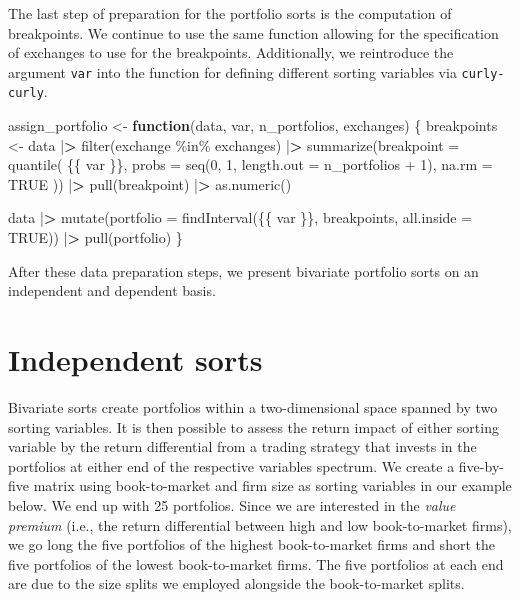 \documentclass[
]{book}
\newenvironment{Shaded}{\begin{snugshade}}{\end{snugshade}}
\newcommand{\AttributeTok}[1]{\textcolor[rgb]{0.61,0.61,0.61}{#1}}
\newcommand{\ConstantTok}[1]{\textcolor[rgb]{0,0,0}{#1}}
\newcommand{\ControlFlowTok}[1]{\textcolor[rgb]{0.27,0.27,0.27}{\textbf{#1}}}
\newcommand{\DecValTok}[1]{\textcolor[rgb]{0.06,0.06,0.06}{#1}}
\newcommand{\ErrorTok}[1]{\textcolor[rgb]{0.14,0.14,0.14}{\textbf{#1}}}
\newcommand{\FunctionTok}[1]{\textcolor[rgb]{0,0,0}{#1}}
\newcommand{\NormalTok}[1]{#1}
\newcommand{\OtherTok}[1]{\textcolor[rgb]{0.37,0.37,0.37}{#1}}
\newcommand{\SpecialCharTok}[1]{\textcolor[rgb]{0,0,0}{#1}}
\begin{document}
The last step of preparation for the portfolio sorts is the computation of breakpoints. We continue to use the same function allowing for the specification of exchanges to use for the breakpoints. Additionally, we reintroduce the argument \texttt{var} into the function for defining different sorting variables via \texttt{curly-curly}.

\begin{Shaded}
\begin{Highlighting}[]
\NormalTok{assign\_portfolio }\OtherTok{\textless{}{-}} \ControlFlowTok{function}\NormalTok{(data, var, n\_portfolios, exchanges) \{}
\NormalTok{  breakpoints }\OtherTok{\textless{}{-}}\NormalTok{ data }\SpecialCharTok{|}\ErrorTok{\textgreater{}}
    \FunctionTok{filter}\NormalTok{(exchange }\SpecialCharTok{\%in\%}\NormalTok{ exchanges) }\SpecialCharTok{|}\ErrorTok{\textgreater{}}
    \FunctionTok{summarize}\NormalTok{(}\AttributeTok{breakpoint =} \FunctionTok{quantile}\NormalTok{(}
\NormalTok{      \{\{ var \}\},}
      \AttributeTok{probs =} \FunctionTok{seq}\NormalTok{(}\DecValTok{0}\NormalTok{, }\DecValTok{1}\NormalTok{, }\AttributeTok{length.out =}\NormalTok{ n\_portfolios }\SpecialCharTok{+} \DecValTok{1}\NormalTok{),}
      \AttributeTok{na.rm =} \ConstantTok{TRUE}
\NormalTok{    )) }\SpecialCharTok{|}\ErrorTok{\textgreater{}}
    \FunctionTok{pull}\NormalTok{(breakpoint) }\SpecialCharTok{|}\ErrorTok{\textgreater{}}
    \FunctionTok{as.numeric}\NormalTok{()}

\NormalTok{  data }\SpecialCharTok{|}\ErrorTok{\textgreater{}}
    \FunctionTok{mutate}\NormalTok{(}\AttributeTok{portfolio =} \FunctionTok{findInterval}\NormalTok{(\{\{ var \}\}, }
\NormalTok{                                    breakpoints, }\AttributeTok{all.inside =} \ConstantTok{TRUE}\NormalTok{)) }\SpecialCharTok{|}\ErrorTok{\textgreater{}}
    \FunctionTok{pull}\NormalTok{(portfolio)}
\NormalTok{\}}
\end{Highlighting}
\end{Shaded}

After these data preparation steps, we present bivariate portfolio sorts on an independent and dependent basis.

\hypertarget{independent-sorts}{%
\section{Independent sorts}\label{independent-sorts}}

Bivariate sorts create portfolios within a two-dimensional space spanned by two sorting variables. It is then possible to assess the return impact of either sorting variable by the return differential from a trading strategy that invests in the portfolios at either end of the respective variables spectrum. We create a five-by-five matrix using book-to-market and firm size as sorting variables in our example below. We end up with 25 portfolios. Since we are interested in the \emph{value premium} (i.e., the return differential between high and low book-to-market firms), we go long the five portfolios of the highest book-to-market firms and short the five portfolios of the lowest book-to-market firms. The five portfolios at each end are due to the size splits we employed alongside the book-to-market splits.
\end{document}
